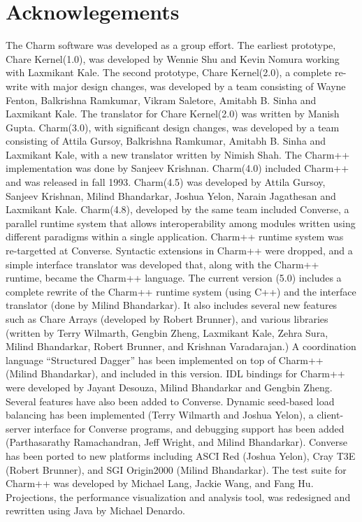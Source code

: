\section*{Acknowlegements}

\large
The Charm software was developed as a group effort.  The earliest
prototype, Chare Kernel(1.0), was developed by Wennie Shu and Kevin
Nomura working with Laxmikant Kale.  The second prototype, Chare
Kernel(2.0), a complete re-write with major design changes, was
developed by a team consisting of Wayne Fenton, Balkrishna Ramkumar,
Vikram Saletore, Amitabh B. Sinha and Laxmikant Kale. The translator
for Chare Kernel(2.0) was written by Manish Gupta.  Charm(3.0), with
significant design changes, was developed by a team consisting of
Attila Gursoy, Balkrishna Ramkumar, Amitabh B.  Sinha and Laxmikant
Kale, with a new translator written by Nimish Shah.  The Charm++
implementation was done by Sanjeev Krishnan.  Charm(4.0) included
Charm++ and was released in fall 1993.  Charm(4.5) was developed by
Attila Gursoy, Sanjeev Krishnan, Milind Bhandarkar, Joshua Yelon,
Narain Jagathesan and Laxmikant Kale.  Charm(4.8), developed by the
same team included Converse, a parallel runtime system that allows
interoperability among modules written using different paradigms
within a single application. Charm++ runtime system was re-targetted
at Converse. Syntactic extensions in Charm++ were dropped, and a
simple interface translator was developed that, along with the Charm++
runtime, became the Charm++ language.  The current version (5.0)
includes a complete rewrite of the Charm++ runtime system (using C++)
and the interface translator (done by Milind Bhandarkar).  It also
includes several new features such as Chare Arrays (developed by
Robert Brunner), and various libraries (written by Terry Wilmarth,
Gengbin Zheng, Laxmikant Kale, Zehra Sura, Milind Bhandarkar, Robert
Brunner, and Krishnan Varadarajan.) A coordination language
``Structured Dagger'' has been implemented on top of Charm++ (Milind
Bhandarkar), and included in this version.  IDL bindings for Charm++
were developed by Jayant Desouza, Milind Bhandarkar and Gengbin
Zheng. Several features have also been added to Converse. Dynamic
seed-based load balancing has been implemented (Terry Wilmarth and
Joshua Yelon), a client-server interface for Converse programs, and
debugging support has been added (Parthasarathy Ramachandran, Jeff
Wright, and Milind Bhandarkar).  Converse has been ported to new
platforms including ASCI Red (Joshua Yelon), Cray T3E (Robert
Brunner), and SGI Origin2000 (Milind Bhandarkar).  The test suite for
Charm++ was developed by Michael Lang, Jackie Wang, and Fang
Hu. Projections, the performance visualization and analysis tool, was
redesigned and rewritten using Java by Michael Denardo.

\normalsize

